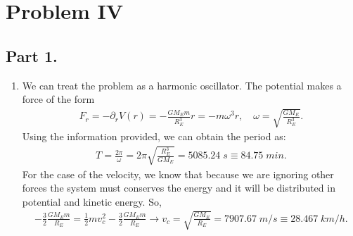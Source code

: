 \documentclass[letterpaper,11pt,twoside]{article}
\begin{document}
\section*{Problem IV}

\subsection*{Part 1.}
\begin{enumerate}[itemsep=0pt,topsep=0pt,label=\alph*)]
  \item We can treat the problem as a harmonic oscillator. The potential makes a force of the form
  \begin{align*}
    F_r=-\partial_rV(r)=-\frac{GM_Em}{R_E^3}r=-m\omega^3r,\quad\omega=\sqrt{\frac{GM_E}{R_E^3}}.
  \end{align*}
  Using the information provided, we can obtain the period as:
  \begin{align*}
    T=\frac{2\pi}{\omega}=2\pi\sqrt{\frac{R_E^3}{GM_E}}=5085.24\;s\equiv84.75\;min.
  \end{align*}
  For the case of the velocity, we know that because we are ignoring other forces the system must conserves the energy and it will be distributed in potential and kinetic energy.
  So,
  \begin{align*}
    -\frac{3}{2}\frac{GM_Em}{R_E}=\frac{1}{2}mv_c^2-\frac{3}{2}\frac{GM_Em}{R_E}\longrightarrow v_c=\sqrt{\frac{GM_E}{R_E}}=7907.67\;m/s\equiv28.467\;km/h.
  \end{align*}
\end{enumerate}
\end{document}
